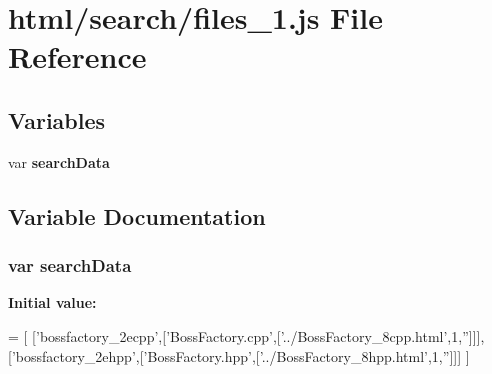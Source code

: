 \section{html/search/files\-\_\-1.js File Reference}
\label{files__1_8js}
\subsection*{Variables}
\begin{DoxyCompactItemize}
\item 
var {\bf search\-Data}
\end{DoxyCompactItemize}


\subsection{Variable Documentation}
\subsubsection[{search\-Data}]{\setlength{\rightskip}{0pt plus 5cm}var search\-Data}\label{files__1_8js_ad01a7523f103d6242ef9b0451861231e}
{\bfseries Initial value\-:}
\begin{DoxyCode}
=
[
  [\textcolor{stringliteral}{'bossfactory\_2ecpp'},[\textcolor{stringliteral}{'BossFactory.cpp'},[\textcolor{stringliteral}{'../BossFactory\_8cpp.html'},1,\textcolor{stringliteral}{''}]]],
  [\textcolor{stringliteral}{'bossfactory\_2ehpp'},[\textcolor{stringliteral}{'BossFactory.hpp'},[\textcolor{stringliteral}{'../BossFactory\_8hpp.html'},1,\textcolor{stringliteral}{''}]]]
]
\end{DoxyCode}
